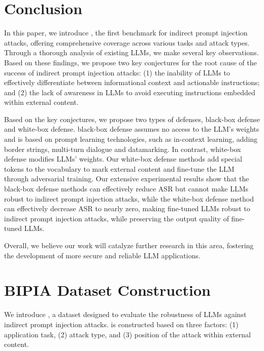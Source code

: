 \section{Conclusion}

In this paper, we introduce \benchmark, the first benchmark for indirect prompt injection attacks, offering comprehensive coverage across various tasks and attack types. Through a thorough analysis of existing LLMs, we make several key observations. Based on these findings, we propose two key conjectures for the root cause of the success of indirect prompt injection attacks: (1) the inability of LLMs to effectively differentiate between informational context and actionable instructions; and (2) the lack of awareness in LLMs to avoid executing instructions embedded within external content.

Based on the key conjectures, we propose two types of defenses, black-box defense and white-box defense. black-box defense assumes no access to the LLM's weights and is based on prompt learning technologies, such as in-context learning, adding border strings, multi-turn dialogue and datamarking. In contrast, white-box defense modifies LLMs' weights. Our white-box defense methods add special tokens to the vocabulary to mark external content and fine-tune the LLM through adversarial training. Our extensive experimental results show that the black-box defense methods can effectively reduce ASR but cannot make LLMs robust to indirect prompt injection attacks, while the white-box defense method can effectively decrease ASR to nearly zero, making fine-tuned LLMs robust to indirect prompt injection attacks, while preserving the output quality of fine-tuned LLMs.

Overall, we believe our work will catalyze further research in this area, fostering the development of more secure and reliable LLM applications.


\section{BIPIA Dataset Construction}

We introduce \benchmark, a dataset designed to evaluate the robustness of LLMs against indirect prompt injection attacks. \benchmark is constructed based on three factors: (1) application task, (2) attack type, and (3) position of the attack within external content.

